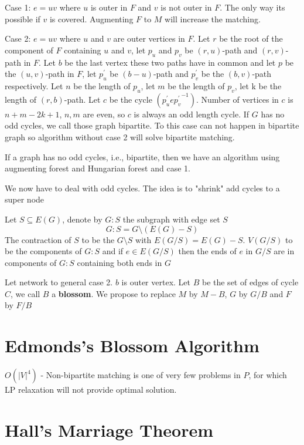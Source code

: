 				Case 1: $e=uv$ where $u$ is outer in $F$ and $v$ is not outer in $F$. The only way its possible if $v$ is covered. Augmenting $F$ to $M$ will increase the matching. 

				Case 2: $e=uv$ where $u$ and $v$ are outer vertices in $F$. Let $r$ be the root of the component of $F$ containing $u$ and $v$, let $p_u$ and $p_v$ be $(r,u)$-path and $(r, v)$-path in $F$. Let $b$ be the last vertex these two paths have in common and let $p$ be the $(u, v)$-path in $F$, let $p_u^\prime$ be $(b-u)$-path and $p_v^\prime$ be the $(b,v)$-path respectively. Let $n$ be the length of $p_u$, let $m$ be the length of $p_v$, let k be the length of $(r, b)$-path. Let $c$ be the cycle $(p_u^\prime e {p_v^{\prime}}^{-1})$. Number of vertices in $c$ is $n + m-2k + 1$, $n, m$ are even, so $c$ is always an odd length cycle. If $G$ has no odd cycles, we call those graph bipartite. To this case can not happen in bipartite graph so algorithm without case 2 will solve bipartite matching.

				If a graph has no odd cycles, i.e., bipartite, then we have an algorithm using augmenting forest and Hungarian forest and case 1.

				We now have to deal with odd cycles. The idea is to "shrink" add cycles to a super node

				Let $S\subseteq E(G)$, denote by $G: S$ the subgraph with edge set $S$
				\begin{equation}
					G:S = G\setminus (E(G)-S)
				\end{equation}
				The contraction of $S$ to be the $G\setminus S$ with $E(G / S) = E(G) - S$. $V(G/S)$ to be the components of $G:S$ and if $e\in E(G/S)$ then the ends of $e$ in $G/S$ are in components of $G:S$ containing both ends in $G$

				Let network to general case 2. $b$ is outer vertex. Let $B$ be the set of edges of cycle $C$, we call $B$ a \textbf{blossom}. We propose to replace $M$ by $M - B$, $G$ by $G/B$ and $F$ by $F/B$

			\section{Edmonds's Blossom Algorithm}
				$O(|V|^4)$
				- Non-bipartite matching is one of very few problems in $P$, for which LP relaxation will not provide optimal solution.

			\section{Hall's Marriage Theorem}

